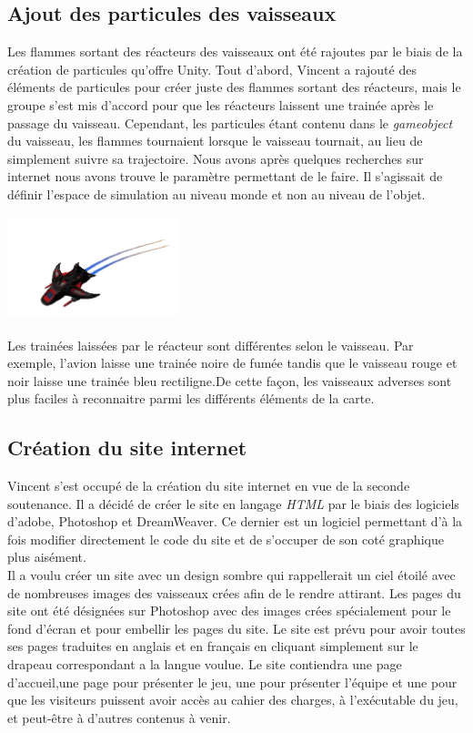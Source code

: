\documentclass[10pt, titlepage]{report}
\begin{document}
\subsection{Ajout des particules des vaisseaux}
Les flammes sortant des réacteurs des vaisseaux ont été rajoutes par le biais de la création de particules qu'offre Unity. Tout d'abord, Vincent a rajouté des éléments de particules pour créer juste des flammes sortant des réacteurs, mais le groupe s'est mis d'accord pour que les réacteurs laissent une trainée après le passage du vaisseau. Cependant, les particules étant contenu dans le \textit{gameobject} du vaisseau, les flammes tournaient lorsque le vaisseau tournait, au lieu de simplement suivre sa trajectoire. Nous avons après quelques recherches sur internet nous avons trouve le paramètre permettant de le faire. Il s'agissait de définir l'espace de simulation au niveau monde et non au niveau de l'objet.\\

\begin{center}
\includegraphics[height=3cm, width=5cm]{vaisseau_bouge.png}
\end{center}

Les trainées laissées par le réacteur sont différentes selon le vaisseau. Par exemple, l'avion laisse une trainée noire de fumée tandis que le vaisseau rouge et noir laisse une trainée bleu rectiligne.De cette façon, les vaisseaux adverses sont plus faciles à reconnaitre parmi les différents éléments de la carte. \\

\subsection{Création du site internet}
Vincent s'est occupé de la création du site internet en vue de la seconde soutenance. Il a décidé de créer le site en langage \textit{HTML} par le biais des logiciels d'adobe, Photoshop et DreamWeaver. Ce dernier est un logiciel permettant d'à la fois modifier directement le code du site et de s'occuper de son coté graphique plus aisément.\\

Il a voulu créer un site avec un design sombre qui rappellerait un ciel étoilé avec de nombreuses images des vaisseaux crées afin de le rendre attirant. Les pages du site ont été désignées sur Photoshop avec des images crées spécialement pour le fond d'écran et pour embellir les pages du site. Le site est prévu pour avoir toutes ses pages traduites en anglais et en français en cliquant simplement sur le drapeau correspondant a la langue voulue. Le site contiendra une page d'accueil,une page pour présenter le jeu, une pour présenter l'équipe et une pour que les visiteurs puissent avoir accès au cahier des charges, à l'exécutable du jeu, et peut-être à d'autres contenus à venir.\\
\end{document}
